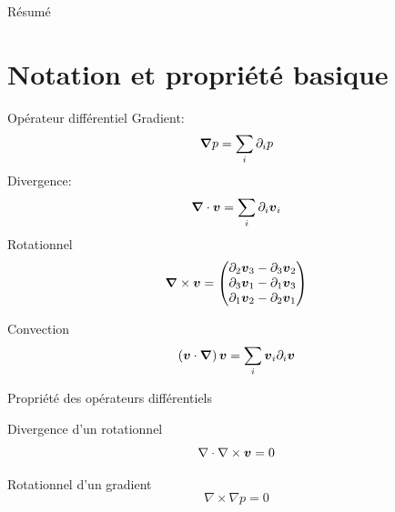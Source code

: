 \date[\today] %
{\today}

\subject{Navier-Stokes}



\setlength{\belowdisplayskip}{0pt}%
\setlength{\abovedisplayskip}{0pt}%
\begin{frame}
  \titlepage
\end{frame}

\begin{frame}[shrink]{Résumé}
  \tableofcontents[pausesections]
\end{frame}

\section{Notation et propriété basique}

\begin{frame}{Opérateur différentiel}
Gradient:
\begin{equation*}
 {\boldsymbol {\nabla}}p=\sum_{i}\partial_{i}p
\end{equation*}
Divergence:
\begin{equation*}
 {\boldsymbol {\nabla}}\cdot {\boldsymbol {v}}=\sum_{i}\partial_{i}{\boldsymbol {v}}_{i}
\end{equation*}
Rotationnel
\begin{equation*}
 {\boldsymbol {\nabla}} \times {\boldsymbol {v}}=\begin{pmatrix}
                                \partial_{2}{\boldsymbol {v}}_{3}-\partial_{3}{\boldsymbol {v}}_{2}\\
                                \partial_{3}{\boldsymbol {v}}_{1}-\partial_{1}{\boldsymbol {v}}_{3}\\
                                \partial_{1}{\boldsymbol {v}}_{2}-\partial_{2}{\boldsymbol {v}}_{1}\\
                               \end{pmatrix}
 \end{equation*}

Convection
\begin{equation*}
 \left({\boldsymbol {v}}\cdot {\boldsymbol {\nabla}}\right){\boldsymbol {v}}=\sum_{i} {\boldsymbol {v}}_{i}\partial_{i} {\boldsymbol {v}}
 \end{equation*}

\end{frame}
\begin{frame}[<+->]{Propriété des opérateurs différentiels}
 \begin{property}{Divergence d'un rotationnel}
  \begin{equation*}
  \nabla \cdot \nabla \times {\boldsymbol {v}}=0
  \end{equation*}
 \end{property}

 \begin{property}{Rotationnel d'un gradient}
  \begin{equation*}
  \nabla \times \nabla p=0
  \end{equation*}
 \end{property}
\end{frame}

